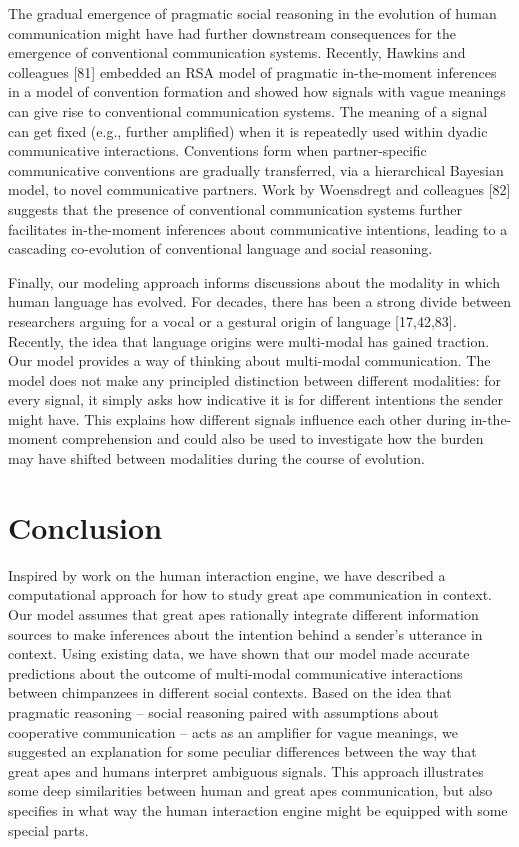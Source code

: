 \documentclass[
  english,
  man,floatsintext]{apa6}
\begin{document}
The gradual emergence of pragmatic social reasoning in the evolution of human communication might have had further downstream consequences for the emergence of conventional communication systems. Recently, Hawkins and colleagues {[}81{]} embedded an RSA model of pragmatic in-the-moment inferences in a model of convention formation and showed how signals with vague meanings can give rise to conventional communication systems. The meaning of a signal can get fixed (e.g., further amplified) when it is repeatedly used within dyadic communicative interactions. Conventions form when partner-specific communicative conventions are gradually transferred, via a hierarchical Bayesian model, to novel communicative partners. Work by Woensdregt and colleagues {[}82{]} suggests that the presence of conventional communication systems further facilitates in-the-moment inferences about communicative intentions, leading to a cascading co-evolution of conventional language and social reasoning.

Finally, our modeling approach informs discussions about the modality in which human language has evolved. For decades, there has been a strong divide between researchers arguing for a vocal or a gestural origin of language {[}17,42,83{]}. Recently, the idea that language origins were multi-modal has gained traction. Our model provides a way of thinking about multi-modal communication. The model does not make any principled distinction between different modalities: for every signal, it simply asks how indicative it is for different intentions the sender might have. This explains how different signals influence each other during in-the-moment comprehension and could also be used to investigate how the burden may have shifted between modalities during the course of evolution.

\hypertarget{conclusion}{%
\section{Conclusion}\label{conclusion}}

Inspired by work on the human interaction engine, we have described a computational approach for how to study great ape communication in context. Our model assumes that great apes rationally integrate different information sources to make inferences about the intention behind a sender's utterance in context. Using existing data, we have shown that our model made accurate predictions about the outcome of multi-modal communicative interactions between chimpanzees in different social contexts. Based on the idea that pragmatic reasoning -- social reasoning paired with assumptions about cooperative communication -- acts as an amplifier for vague meanings, we suggested an explanation for some peculiar differences between the way that great apes and humans interpret ambiguous signals. This approach illustrates some deep similarities between human and great apes communication, but also specifies in what way the human interaction engine might be equipped with some special parts.
\end{document}
